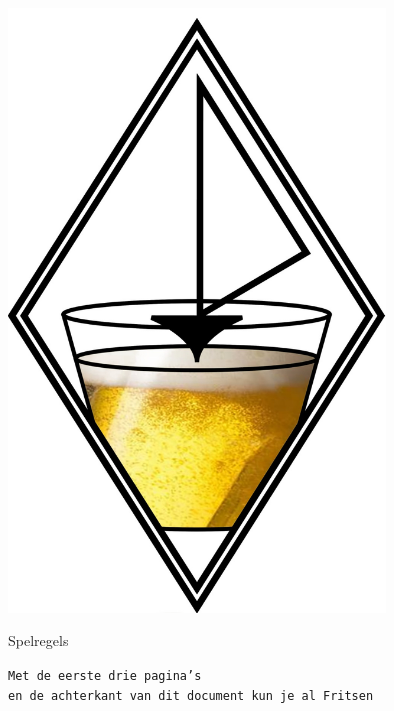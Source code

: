 \begin{center}
    \includegraphics[width=10cm]{bier_2.jpg}
\end{center}

\vspace{-0.1cm}

\begingroup
    \fontsize{80pt}{82pt}\selectfont
    \begin{center}
        Spelregels  
    \end{center}
\endgroup

\vspace{0.1cm}

\begingroup
    \fontsize{30pt}{32pt}\selectfont
    \begin{center}
        \texttt{Met de eerste drie pagina's \\en de achterkant van dit document kun je al Fritsen}
    \end{center}
\endgroup



\newpage